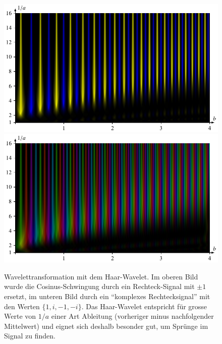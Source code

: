\begin{figure}
	\centering
	\includegraphics[width=\linewidth, keepaspectratio]{papers/complex/images/add_rs_chirp_haar.pdf}
	\includegraphics[width=\linewidth, keepaspectratio]{papers/complex/images/add_cs_chirp_haar.pdf}
	\caption{Wavelettransformation mit dem Haar-Wavelet. 
		Im oberen Bild wurde die Cosinus-Schwingung durch ein Rechteck-Signal mit $\pm 1$ ersetzt, im unteren Bild durch ein ``komplexes Rechtecksignal'' mit den Werten $\lbrace1, i, -1, -i\rbrace$.
		Das Haar-Wavelet entspricht für grosse Werte von $1/a$ einer Art Ableitung (vorheriger minus nachfolgender Mittelwert) und eignet sich deshalb besonder gut, um Sprünge im Signal zu finden.}
\end{figure}

